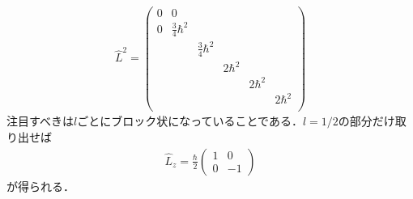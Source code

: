 \documentclass{report}
\begin{document}
\begin{align}
  \hat{L}^2 =
  \begin{pmatrix}
    0 & 0 & & & & \\
    0 & \frac{3}{4}\hbar^2 & & & & \\
    & & \frac{3}{4}\hbar^2 & & & \\
    & & & 2\hbar^2 & & \\
    & & & & 2\hbar^2 & \\
    & & & & & 2\hbar^2 \\
  \end{pmatrix}
\end{align}
注目すべきは$l$ごとにブロック状になっていることである．$l=1/2$の部分だけ取り出せば
\begin{align}
  \hat{L}_z = \frac{\hbar}{2}
  \begin{pmatrix}
    1 & 0\\
    0 & -1
  \end{pmatrix}
\end{align}
が得られる．
\end{document}
